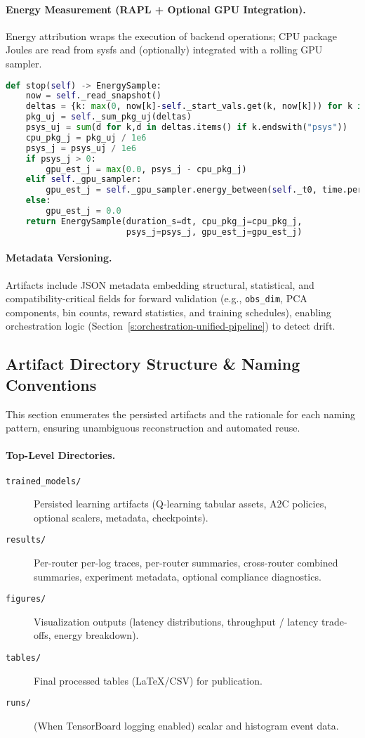 \paragraph{Energy Measurement (RAPL + Optional GPU Integration).}
Energy attribution wraps the execution of backend operations; CPU package Joules are read from sysfs and (optionally) integrated with a rolling GPU sampler.
\begin{lstlisting}[language=Python,caption={Energy metering snapshot delta},label={lst:energy}]
def stop(self) -> EnergySample:
    now = self._read_snapshot()
    deltas = {k: max(0, now[k]-self._start_vals.get(k, now[k])) for k in now}
    pkg_uj = self._sum_pkg_uj(deltas)
    psys_uj = sum(d for k,d in deltas.items() if k.endswith("psys"))
    cpu_pkg_j = pkg_uj / 1e6
    psys_j = psys_uj / 1e6
    if psys_j > 0:
        gpu_est_j = max(0.0, psys_j - cpu_pkg_j)
    elif self._gpu_sampler:
        gpu_est_j = self._gpu_sampler.energy_between(self._t0, time.perf_counter())
    else:
        gpu_est_j = 0.0
    return EnergySample(duration_s=dt, cpu_pkg_j=cpu_pkg_j,
                        psys_j=psys_j, gpu_est_j=gpu_est_j)
\end{lstlisting}

\paragraph{Metadata Versioning.}
Artifacts include JSON metadata embedding structural, statistical, and compatibility-critical fields for forward validation (e.g., \texttt{obs\_dim}, PCA components, bin counts, reward statistics, and training schedules), enabling orchestration logic (Section~\ref{s:orchestration-unified-pipeline}) to detect drift.

\subsection{Artifact Directory Structure \& Naming Conventions}
This section enumerates the persisted artifacts and the rationale for each naming pattern, ensuring unambiguous reconstruction and automated reuse.

\paragraph{Top-Level Directories.}
\begin{description}
  \item[\texttt{trained\_models/}] Persisted learning artifacts (Q-learning tabular assets, A2C policies, optional scalers, metadata, checkpoints).
  \item[\texttt{results/}] Per-router per-log traces, per-router summaries, cross-router combined summaries, experiment metadata, optional compliance diagnostics.
  \item[\texttt{figures/}] Visualization outputs (latency distributions, throughput / latency trade-offs, energy breakdown).
  \item[\texttt{tables/}] Final processed tables (LaTeX/CSV) for publication.
  \item[\texttt{runs/}] (When TensorBoard logging enabled) scalar and histogram event data.
\end{description}

